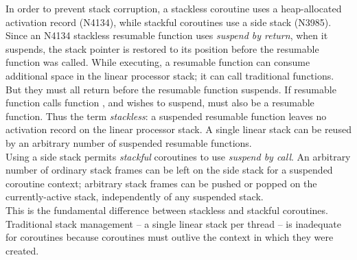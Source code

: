 In order to prevent stack corruption, a stackless coroutine uses a heap-allocated
activation record (N4134\cite{N4134}), while stackful coroutines use a side
stack (N3985\cite{N3985}).\\
Since an N4134 stackless resumable function uses \emph{suspend by return},
when it suspends, the stack pointer is restored to its position before the
resumable function was called. While executing, a resumable function can
consume additional space in the linear processor stack; it can call
traditional functions. But they must all return before the resumable function
suspends. If resumable function  calls function , and
 wishes to suspend,  must also be a resumable function. Thus
the term \emph{stackless}: a suspended resumable function leaves no activation
record on the linear processor stack. A single linear stack can be reused by
an arbitrary number of suspended resumable functions.\\
Using a side stack permits \emph{stackful} coroutines to use \emph{suspend by
call}. An arbitrary number of ordinary stack frames can be left on the side
stack for a suspended coroutine context; arbitrary stack frames can be pushed
or popped on the currently-active stack, independently of any suspended stack.\\
This is the fundamental difference between stackless and stackful coroutines.\\
\newline
Traditional stack management -- a single linear stack per thread -- is
inadequate for coroutines because coroutines must outlive the context in which
they were created.
\newpage
